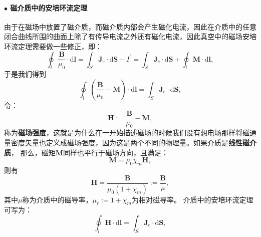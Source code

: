 \documentclass[10pt,reqno, final]{ctexart}
\begin{document}
\paragraph{$\bullet$ 磁介质中的安培环流定理} 由于在磁场中放置了磁介质，而磁介质内部会产生磁化电流，因此在介质中的任意闭合曲线所围的曲面上除了有传导电流之外还有磁化电流，因此真空中的磁场安培环流定理需要做一些修正，即：
\begin{equation}
\oint_l \frac{\bm{B}}{\mu_0}\cdot \mathrm{d}\bm{l} = \int_S \bm{J}_e\cdot\mathrm{d}\bm{S}+I^\prime=\int_S \bm{J}_e\cdot\mathrm{d}\bm{S}+\oint_l \bm{M}\cdot\mathrm{d}\bm{l},
\end{equation}
于是我们得到
\begin{equation}
\oint_l \left(\frac{\bm{B}}{\mu_0}-\bm{M}\right) \cdot \mathrm{d}\bm{l}= \int_S \bm{J}_e\cdot\mathrm{d}\bm{S},
\end{equation}
令：
\begin{equation}\label{cichangqiangdu}
\bm{H} := \frac{\bm{B}}{\mu_0}-\bm{M},
\end{equation}
称为\textbf{磁场强度}，这就是为什么在一开始描述磁场的时候我们没有想电场那样将磁通量密度矢量也定义成磁场强度，因为这是两个不同的物理量。如果介质是\textbf{线性磁介质}， 那么，磁矩$\bm{M}$同样也平行于磁场方向，且满足：
\begin{equation}
\bm{M}=\mu_0\chi_m \bm{H},
\end{equation}
则有
\begin{equation}
\bm{H}=\frac{\bm{B}}{\mu_0(1+\chi_m)}:=\frac{\bm{B}}{\mu},
\end{equation}
其中$\mu$称为介质中的磁导率，$\mu_r:=1+\chi_m$为相对磁导率。
介质中的安培环流定理可写为：
\begin{equation}\label{cichanghuanliudinglijifen}
\oint_l \bm{H}\cdot\mathrm{d}\bm{l} = \int_S \bm{J}_e\cdot\mathrm{d}\bm{S},
\end{equation}
\end{document}
